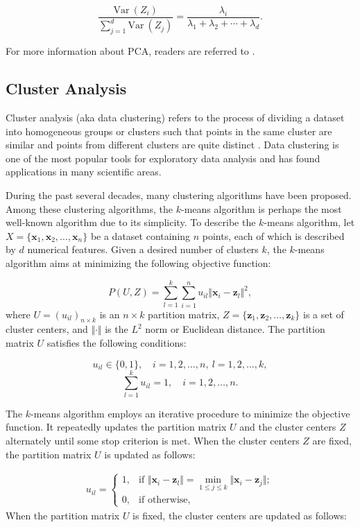 \documentclass[]{book}
\theoremstyle{definition}
\theoremstyle{definition}
\theoremstyle{definition}
\theoremstyle{remark}
\begin{document}
\[\dfrac{\mathrm{Var~}{(Z_i)}}{ \sum_{j=1}^{d} \mathrm{Var~}{(Z_j)}} = \dfrac{\lambda_i}{\lambda_1+\lambda_2+\cdots+\lambda_d}.\]

For more information about PCA, readers are referred to
\citep{mirkin2011}.

\subsection{Cluster Analysis}\label{cluster-analysis}

Cluster analysis (aka data clustering) refers to the process of dividing
a dataset into homogeneous groups or clusters such that points in the
same cluster are similar and points from different clusters are quite
distinct \citep{gan2007, gan2011}. Data clustering is one of the most
popular tools for exploratory data analysis and has found applications
in many scientific areas.

During the past several decades, many clustering algorithms have been
proposed. Among these clustering algorithms, the \(k\)-means algorithm
is perhaps the most well-known algorithm due to its simplicity. To
describe the \(k\)-means algorithm, let
\(X=\{\textbf{x}_1,\textbf{x}_2,\ldots,\textbf{x}_n\}\) be a dataset
containing \(n\) points, each of which is described by \(d\) numerical
features. Given a desired number of clusters \(k\), the \(k\)-means
algorithm aims at minimizing the following objective function:

\[P(U,Z) = \sum_{l=1}^k\sum_{i=1}^n u_{il} \Vert \textbf{x}_i-\textbf{z}_l\Vert^2,\]
where \(U=(u_{il})_{n\times k}\) is an \(n\times k\) partition matrix,
\(Z=\{\textbf{z}_1,\textbf{z}_2,\ldots,\textbf{z}_k\}\) is a set of
cluster centers, and \(\Vert\cdot\Vert\) is the \(L^2\) norm or
Euclidean distance. The partition matrix \(U\) satisfies the following
conditions:

\[u_{il}\in \{0,1\},\quad i=1,2,\ldots,n,\:l=1,2,\ldots,k,\]
\[\sum_{l=1}^k u_{il}=1,\quad i=1,2,\ldots,n.\]

The \(k\)-means algorithm employs an iterative procedure to minimize the
objective function. It repeatedly updates the partition matrix \(U\) and
the cluster centers \(Z\) alternately until some stop criterion is met.
When the cluster centers \(Z\) are fixed, the partition matrix \(U\) is
updated as follows:

\[\begin{aligned}u_{il}=\left\{
\begin{array}{ll}
1, & \text{if } \Vert \textbf{x}_i - \textbf{z}_l\Vert = \min_{1\le j\le k} \Vert \textbf{x}_i - \textbf{z}_j\Vert;\\
0, & \text{if otherwise,}
\end{array}
\right.
\end{aligned}\] When the partition matrix \(U\) is fixed, the cluster
centers are updated as follows:
\end{document}
